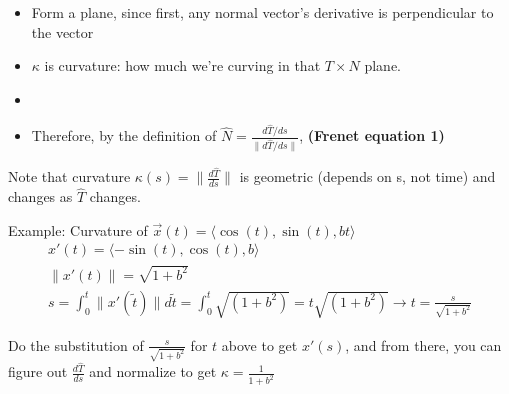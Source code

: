 \documentclass[11pt, oneside]{article}   	%
\begin{document}
\begin{itemize}
\item Form a plane, since first, any normal vector's derivative is perpendicular to the vector
\item $\kappa$ is curvature: how much we're curving in that $T \times N$ plane.
\item {}
\item Therefore, by the definition of $\hat{N} = \frac{d\hat{T}/ds}{\|d\hat{T}/ds\|}$, \textbf{(Frenet equation 1)}
\end{itemize}

Note that curvature $\kappa(s) = \| \frac{d\hat{T}}{ds}\|$ is geometric (depends on s, not time) and changes as $\hat{T}$ changes.

Example: Curvature of $\vec{x}(t) = \langle \cos(t), \sin(t), bt \rangle$ 
\begin{align}
x'(t) = \langle -\sin(t), \cos(t), b \rangle \\ 
\|x'(t) \| = \sqrt{1 + b^2} \\ 
s = \int_0^t\|x'(\tilde{t})\| d\tilde{t} = \int_0^t \sqrt{(1+b^2)} = t\sqrt{(1+b^2)} \rightarrow t = \frac{s}{\sqrt{1+b^2}}
\end{align}

Do the substitution of $\frac{s}{\sqrt{1+b^2}}$ for $t$ above to get $x'(s)$, and from there, you can figure out $\frac{d\hat{T}}{ds}$ and normalize to get $\kappa = \frac{1}{1+b^2}$
\end{document}
